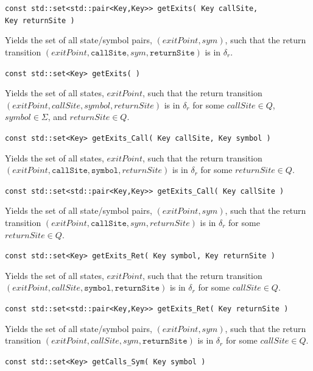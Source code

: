 \documentclass{llncs}
\begin{document}
\begin{description}
  \item\texttt{const std::set<std::pair<Key,Key>> getExits( Key callSite,\\ \hspace*{3.25cm} Key returnSite )} \nopagebreak

    Yields the set of all state/symbol pairs, $(exitPoint,sym)$, such that the return transition $(exitPoint,\texttt{callSite},sym,\texttt{returnSite})$ is in $\delta_r$.

  \item\texttt{const std::set<Key> getExits( )} \nopagebreak

    Yields the set of all states, $exitPoint$, such that the return transition $(exitPoint,callSite,symbol,returnSite)$ is in $\delta_r$ for some $callSite \in Q$, $symbol \in \Sigma$, and $returnSite \in Q$.

  \item\texttt{const std::set<Key> getExits\_Call( Key callSite, Key symbol )} \nopagebreak

    Yields the set of all states, $exitPoint$, such that the return transition $(exitPoint,\texttt{callSite},\texttt{symbol},returnSite)$ is in $\delta_r$ for some $returnSite \in Q$.

  \item\texttt{const std::set<std::pair<Key,Key>> getExits\_Call( Key callSite )} \nopagebreak

    Yields the set of all state/symbol pairs, $(exitPoint,sym)$, such that the return transition $(exitPoint,\texttt{callSite},sym,returnSite)$ is in $\delta_r$ for some $returnSite \in Q$.

  \item\texttt{const std::set<Key> getExits\_Ret( Key symbol, Key returnSite )} \nopagebreak

    Yields the set of all states, $exitPoint$, such that the return transition $(exitPoint,callSite,\texttt{symbol},\texttt{returnSite})$ is in $\delta_r$ for some $callSite \in Q$.

  \item\texttt{const std::set<std::pair<Key,Key>> getExits\_Ret( Key returnSite )} \nopagebreak

    Yields the set of all state/symbol pairs, $(exitPoint,sym)$, such that the return transition $(exitPoint,callSite,sym,\texttt{returnSite})$ is in $\delta_r$ for some $callSite \in Q$.

  \item\texttt{const std::set<Key> getCalls\_Sym( Key symbol )} \nopagebreak


\end{description}
\end{document}
